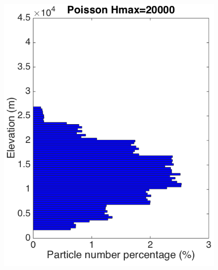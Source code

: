 \begin{figure}[!htb]
\begin{minipage}{.247 \textwidth}
        \includegraphics[width=0.99 \textwidth]{Chapter-7/Figures/Possion-Hmax20k-ParticleDis-z}
    \end{minipage}%
    \begin{minipage}{.247 \textwidth}
        \centering

\end{minipage}
\end{figure}
